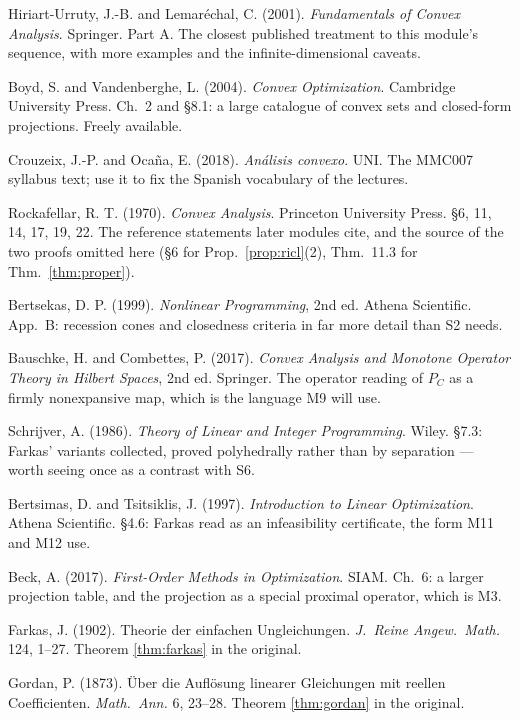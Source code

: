 \documentclass[11pt,a4paper]{article}
\theoremstyle{definition}
\theoremstyle{plain}
\theoremstyle{remark}
\newcommand{\proj}{P}
\begin{document}
\begin{enumerate}[label={[\arabic*]}]
\item Hiriart-Urruty, J.-B. and Lemar\'echal, C. (2001). \emph{Fundamentals of Convex
Analysis}. Springer. Part A. The closest published treatment to this module's sequence, with
more examples and the infinite-dimensional caveats.
\item Boyd, S. and Vandenberghe, L. (2004). \emph{Convex Optimization}. Cambridge University
Press. Ch.~2 and \S 8.1: a large catalogue of convex sets and closed-form projections. Freely
available.
\item Crouzeix, J.-P. and Oca\~na, E. (2018). \emph{An\'alisis convexo}. UNI. The MMC007
syllabus text; use it to fix the Spanish vocabulary of the lectures.
\item Rockafellar, R. T. (1970). \emph{Convex Analysis}. Princeton University Press. \S 6, 11,
14, 17, 19, 22. The reference statements later modules cite, and the source of the two proofs
omitted here (\S 6 for Prop.~\ref{prop:ricl}(2), Thm.~11.3 for Thm.~\ref{thm:proper}).
\item Bertsekas, D. P. (1999). \emph{Nonlinear Programming}, 2nd ed. Athena Scientific.
App.~B: recession cones and closedness criteria in far more detail than S2 needs.
\item Bauschke, H. and Combettes, P. (2017). \emph{Convex Analysis and Monotone Operator Theory
in Hilbert Spaces}, 2nd ed. Springer. The operator reading of $\proj_C$ as a firmly
nonexpansive map, which is the language M9 will use.
\item Schrijver, A. (1986). \emph{Theory of Linear and Integer Programming}. Wiley. \S 7.3:
Farkas' variants collected, proved polyhedrally rather than by separation --- worth seeing once
as a contrast with S6.
\item Bertsimas, D. and Tsitsiklis, J. (1997). \emph{Introduction to Linear Optimization}.
Athena Scientific. \S 4.6: Farkas read as an infeasibility certificate, the form M11 and M12
use.
\item Beck, A. (2017). \emph{First-Order Methods in Optimization}. SIAM. Ch.~6: a larger
projection table, and the projection as a special proximal operator, which is M3.
\item Farkas, J. (1902). Theorie der einfachen Ungleichungen. \emph{J.\ Reine Angew.\ Math.}
124, 1--27. Theorem \ref{thm:farkas} in the original.
\item Gordan, P. (1873). \"Uber die Aufl\"osung linearer Gleichungen mit reellen Coefficienten.
\emph{Math.\ Ann.} 6, 23--28. Theorem \ref{thm:gordan} in the original.

\end{enumerate}
\end{document}
